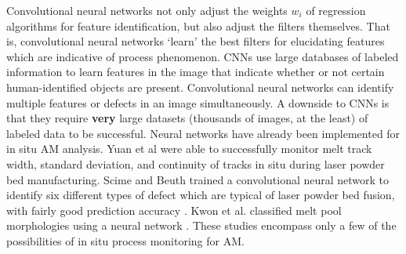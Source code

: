 Convolutional neural networks not only adjust the weights $w_i$ of regression algorithms for feature identification, but also adjust the filters themselves. That is, convolutional neural networks `learn' the best filters for elucidating features which are indicative of process phenomenon.  CNNs use large databases of labeled information to learn features in the image that indicate whether or not certain human-identified objects are present. Convolutional neural networks can identify multiple features or defects in an image simultaneously. A downside to CNNs is that they require \textbf{very} large datasets (thousands of images, at the least) of labeled data to be successful. Neural networks have already been implemented for in situ AM analysis. Yuan et al \cite{Yuan2018} were able to successfully monitor melt track width, standard deviation, and continuity of tracks in situ during laser powder bed manufacturing. Scime and Beuth trained a convolutional neural network to identify six different types of defect which are typical of laser powder bed fusion, with fairly good prediction accuracy \cite{Scime2018}. Kwon et al. classified melt pool morphologies using a neural network \cite{Kwon2018}. These studies encompass only a few of the possibilities of in situ process monitoring for AM. 



